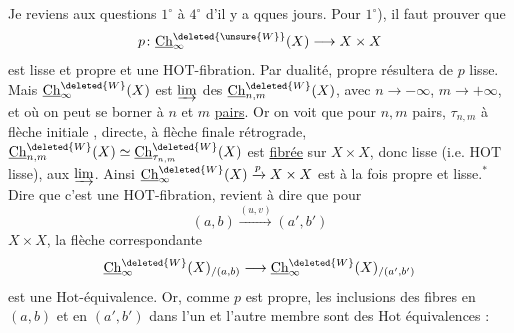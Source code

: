 Je reviens aux questions $1^\circ$ à $4^\circ$ d'il y a qques
jours. Pour $1^\circ$), il faut prouver que
\[
p\colon\underline{\mathrm{Ch}}^{\deleted{\unsure{W}}}_{\infty}(X)\longrightarrow X\times X
\]
est lisse et propre et une $\mathrm{HOT}$-fibration. Par
dualité,  propre résultera de $p$ lisse. Mais
$\underline{\mathrm{Ch}}^{\deleted{W}}_{\infty}(X)$ est $\varinjlim$ des $\underline{\mathrm{Ch}}^{\deleted{W}}_{n,m}(X)$, avec $n\longrightarrow-\infty$, $m\longrightarrow+\infty$,
et où on peut se borner à $n$ et $m$ \uline{pairs}. Or
on voit que pour $n,m$ pairs,  $\tau_{n,m}$ à flèche
initiale , directe, à flèche finale rétrograde,
$\underline{\mathrm{Ch}}_{n,m}^{\deleted{W}}(X)\simeq\underline{\mathrm{Ch}}_{\tau_{n,m}}^{\deleted{W}}(X)$ est \uline{fibrée} sur $X\times X$,
donc  lisse (i.e. $\mathrm{HOT}$ lisse),
  aux $\varinjlim$.
Ainsi $\underline{\mathrm{Ch}}^{\deleted{W}}_{\infty}(X)\xrightarrow{p}X\times X$ est à la fois propre et
lisse.$^{*}$
Dire que c'est une $\mathrm{HOT}$-fibration, revient
à dire que pour
\[
(a,b)\xrightarrow{(u,v)}(a',b')
\]
 $X\times X$, la flèche correspondante
\[
\underline{\mathrm{Ch}}^{\deleted{W}}_{\infty}(X)_{/(a,b)}\longrightarrow
\underline{\mathrm{Ch}}^{\deleted{W}}_{\infty}(X)_{/(a',b')}
\]
est une $\mathrm{Hot}$-équivalence. Or, comme $p$ est
propre, les inclusions des fibres en $(a,b)$ et en
$(a',b')$ dans l'un et l'autre membre sont des
$\mathrm{Hot}$ équivalences :
